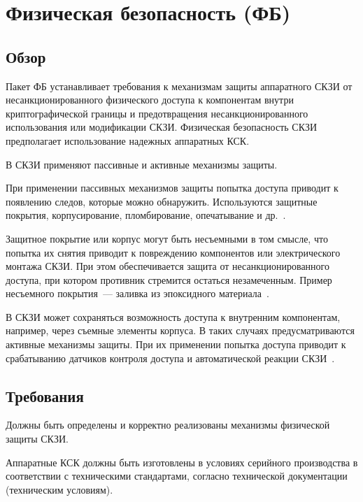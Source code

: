 \section{Физическая безопасность (ФБ)}\label{PS}

\subsection{Обзор}\label{PS.Intro}

Пакет ФБ устанавливает требования к механизмам защиты аппаратного СКЗИ 
от несанкционированного физического доступа к компонентам внутри 
криптографической границы и предотвращения несанкционированного использования 
или модификации СКЗИ.
%
Физическая безопасность СКЗИ предполагает использование надежных аппаратных 
КСК. 

В СКЗИ применяют пассивные и активные механизмы защиты.

При применении пассивных механизмов защиты попытка доступа приводит к появлению
следов, которые можно обнаружить. Используются защитные покрытия,
корпусирование, пломбирование, опечатывание и
др.~.

Защитное покрытие или корпус могут быть несъемными в том смысле, что попытка их 
снятия приводит к повреждению компонентов или электрического монтажа СКЗИ. 
%
При этом обеспечивается защита от несанкционированного доступа, 
при котором противник стремится остаться незамеченным.
%
Пример несъемного покрытия~--- заливка из эпоксидного 
материала~. 
 
В СКЗИ может сохраняться возможность доступа к внутренним компонентам,
например, через съемные элементы корпуса. 
%
В таких случаях предусматриваются активные механизмы защиты. При их применении 
попытка доступа приводит к срабатыванию датчиков контроля доступа и 
автоматической реакции СКЗИ~.

\subsection{Требования}\label{PS.Reqs}

\label{R.PS.List} %
Должны быть определены и корректно реализованы механизмы физической защиты СКЗИ. 

\label{R.PS.Production} %
Аппаратные КСК должны быть изготовлены в условиях серийного 
производства в соответствии с техническими стандартами, согласно технической 
документации (техническим условиям).

